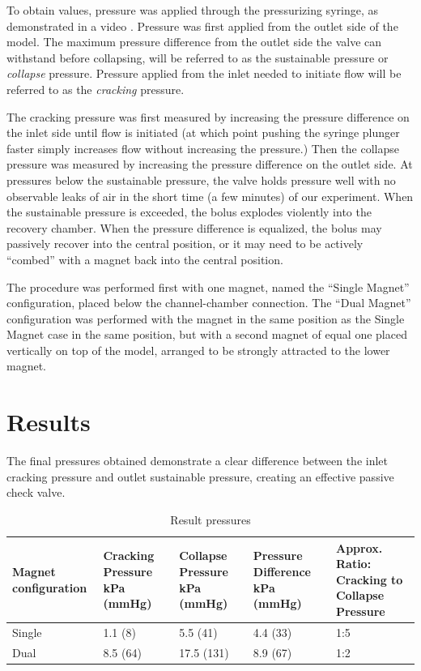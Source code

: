 \documentclass[twocolumn,10pt]{asme2ej}
\begin{document}
To obtain values, pressure was applied through the pressurizing
syringe, as demonstrated in a video \cite{stuckey2021video}.
Pressure was first applied from the outlet side of the model.
The maximum pressure difference from the outlet side the
valve can withstand before collapsing, will be referred to as the
sustainable pressure or {\em collapse} pressure.
Pressure applied from the inlet needed to
initiate flow will be referred to as the {\em cracking} pressure.

The cracking pressure was first measured by increasing the pressure
difference on the inlet side until flow is initiated (at which point
pushing the syringe plunger faster simply increases flow without
increasing the pressure.) Then the
collapse pressure was measured by increasing the pressure
difference on the outlet side. At pressures below the sustainable
pressure, the valve holds pressure well with no observable leaks of
air in the short time (a few minutes) of our experiment. When the
sustainable pressure is exceeded, the bolus explodes violently into
the recovery chamber. When the pressure difference is equalized, the
bolus may passively recover into the central position, or it may need
to be actively “combed” with a magnet back into the central position.

The procedure was performed first with one magnet, named the “Single
Magnet” configuration, placed below the channel-chamber connection.
The “Dual Magnet” configuration was performed with the magnet in the
same position as the Single Magnet case in the same position, but with
a second magnet of equal one placed vertically on top of the model,
arranged to be strongly attracted to the lower magnet.

\section{Results}
The final pressures obtained demonstrate a clear difference between
the inlet cracking pressure and outlet sustainable pressure, creating
an effective passive check valve.

\begin{table}[t]
\footnotesize
\caption{Result pressures}
\begin{center}
\label{table_ASME}
\begin{tabular}{|p{0.3in} |p{0.4in} |p{0.49in} |p{0.45in} |p{0.6in} |}
\hline
Magnet configuration &
Cracking Pressure kPa  (mmHg) &
Collapse Pressure kPa  (mmHg) &
Pressure Difference kPa  (mmHg) &
Approx. Ratio: Cracking to Collapse Pressure \\
\hline
Single &
1.1 (8) &
5.5 (41) &
4.4 (33) &
1:5 \\
\hline
Dual &
8.5 (64) &
17.5 (131)&
8.9 (67)&
1:2 \\
\hline
\end{tabular}
\end{center}
\end{table}
\end{document}
